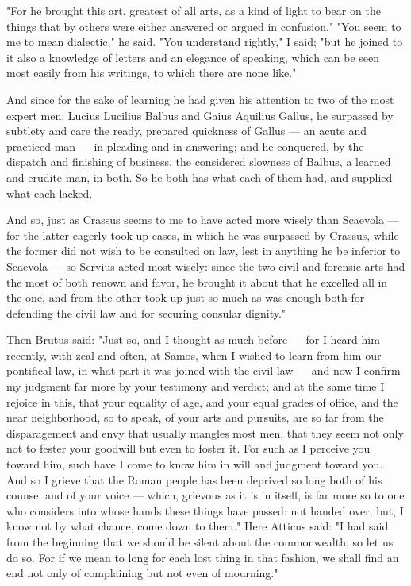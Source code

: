 "For he brought this art, greatest of all arts, as a kind of light to bear on the things that by others were either answered or argued in confusion." "You seem to me to mean dialectic," he said. "You understand rightly," I said; "but he joined to it also a knowledge of letters and an elegance of speaking, which can be seen most easily from his writings, to which there are none like."

 And since for the sake of learning he had given his attention to two of the most expert men, Lucius Lucilius Balbus and Gaius Aquilius Gallus, he surpassed by subtlety and care the ready, prepared quickness of Gallus — an acute and practiced man — in pleading and in answering; and he conquered, by the dispatch and finishing of business, the considered slowness of Balbus, a learned and erudite man, in both. So he both has what each of them had, and supplied what each lacked.

 And so, just as Crassus seems to me to have acted more wisely than Scaevola — for the latter eagerly took up cases, in which he was surpassed by Crassus, while the former did not wish to be consulted on law, lest in anything he be inferior to Scaevola — so Servius acted most wisely: since the two civil and forensic arts had the most of both renown and favor, he brought it about that he excelled all in the one, and from the other took up just so much as was enough both for defending the civil law and for securing consular dignity."

 Then Brutus said: "Just so, and I thought as much before — for I heard him recently, with zeal and often, at Samos, when I wished to learn from him our pontifical law, in what part it was joined with the civil law — and now I confirm my judgment far more by your testimony and verdict; and at the same time I rejoice in this, that your equality of age, and your equal grades of office, and the near neighborhood, so to speak, of your arts and pursuits, are so far from the disparagement and envy that usually mangles most men, that they seem not only not to fester your goodwill but even to foster it. For such as I perceive you toward him, such have I come to know him in will and judgment toward you. And so I grieve that the Roman people has been deprived so long both of his counsel and of your voice — which, grievous as it is in itself, is far more so to one who considers into whose hands these things have passed: not handed over, but, I know not by what chance, come down to them." Here Atticus said: "I had said from the beginning that we should be silent about the commonwealth; so let us do so. For if we mean to long for each lost thing in that fashion, we shall find an end not only of complaining but not even of mourning."

